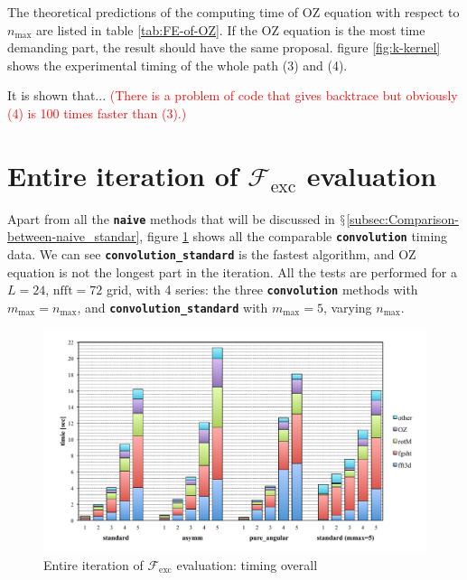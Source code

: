 The theoretical predictions of the computing time of \acs{OZ} equation
with respect to $n_{\max}$ are listed in table \ref{tab:FE-of-OZ}.
If the \acs{OZ} equation is the most time demanding part, the result
should have the same proposal. figure \ref{fig:k-kernel} shows the
experimental timing of the whole path (3) and (4).

It is shown that... \textcolor{red}{(There is a problem of code that
gives backtrace but obviously (4) is 100 times faster than (3).)}

\section{Entire iteration of $\mathcal{F}_{\mathrm{exc}}$ evaluation}

Apart from all the \texttt{\textbf{naive}} methods that will be discussed
in $\mathsection$\ref{subsec:Comparison-between-naive_standar},
figure \ref{fig:Entire-iteration} shows all the comparable \texttt{\textbf{convolution}}
timing data. We can see \texttt{\textbf{convolution\_standard}} is
the fastest algorithm, and OZ equation is not the longest part in
the iteration. All the tests are performed for a $L=24$, $\mathrm{nfft}=72$
grid, with 4 series: the three \texttt{\textbf{convolution}} methods
with$m_{\max}=n_{\max}$, and \texttt{\textbf{convolution\_standard}}
with $m_{\max}=5$, varying $n_{\max}$.

\begin{figure}[H]
\begin{centering}
\includegraphics[bb=0cm 1cm 24cm 13cm,width=0.9\columnwidth]{_figure/results/branch_perf}
\par\end{centering}
\caption{Entire iteration of $\mathcal{F}_{\mathrm{exc}}$ evaluation: timing
overall \label{fig:Entire-iteration}}
\end{figure}


